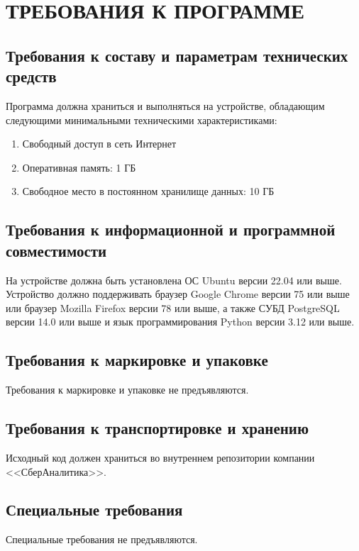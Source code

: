 \section{ТРЕБОВАНИЯ К ПРОГРАММЕ}







\subsection{Требования к составу и параметрам технических средств}

Программа должна храниться и выполняться на устройстве, обладающим следующими минимальными техническими характеристиками:

\begin{enumerate}
    \item Свободный доступ в сеть Интернет
    \item Оперативная память: 1 ГБ
    \item Свободное место в постоянном хранилище данных: 10 ГБ
\end{enumerate}

\subsection{Требования к информационной и программной совместимости}

На устройстве должна быть установлена ОС Ubuntu версии 22.04 или выше. Устройство должно поддерживать браузер Google Chrome версии 75 или выше или браузер Mozilla Firefox версии 78 или выше, а также СУБД PostgreSQL версии 14.0 или выше и язык программирования Python версии 3.12 или выше.

\subsection{Требования к маркировке и упаковке}

Требования к маркировке и упаковке не предъявляются.

\subsection{Требования к транспортировке и хранению}

Исходный код должен храниться во внутреннем репозитории компании <<СберАналитика>>.

\subsection{Специальные требования}

Специальные требования не предъявляются.